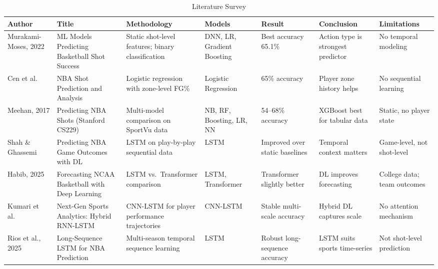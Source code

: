 \documentclass[conference]{IEEEtran}
\begin{document}
\begin{table}[!t]
\centering
\caption{Literature Survey}
\label{tab:litreview}
\renewcommand{\arraystretch}{1.3}
\setlength{\tabcolsep}{2pt}
\scriptsize
\begin{tabular}{|p{1.6cm}|p{3.5cm}|p{3.2cm}|p{1.8cm}|p{2.6cm}|p{2.4cm}|p{2.4cm}|}
\hline
\textbf{Author} & \textbf{Title} & \textbf{Methodology} &
\textbf{Models} & \textbf{Result} & \textbf{Conclusion} &
\textbf{Limitations} \\ \hline

Murakami-Moses, 2022 \cite{b1} &
ML Models Predicting Basketball Shot Success &
Static shot-level features; binary classification &
DNN, LR, Gradient Boosting &
Best accuracy 65.1\% &
Action type is strongest predictor &
No temporal modeling \\ \hline

Cen et al.\ \cite{b2} &
NBA Shot Prediction and Analysis &
Logistic regression with zone-level FG\% &
Logistic Regression &
65\% accuracy &
Player zone history helps &
No sequential learning \\ \hline

Meehan, 2017 \cite{b3} &
Predicting NBA Shots (Stanford CS229) &
Multi-model comparison on SportVu data &
NB, RF, Boosting, LR, NN &
54--68\% accuracy &
XGBoost best for tabular data &
Static, no player state \\ \hline

Shah \& Ghassemi \cite{b5} &
Predicting NBA Game Outcomes with DL &
LSTM on play-by-play sequential data &
LSTM &
Improved over static baselines &
Temporal context matters &
Game-level, not shot-level \\ \hline

Habib, 2025 \cite{b6} &
Forecasting NCAA Basketball with Deep Learning &
LSTM vs.\ Transformer comparison &
LSTM, Transformer &
Transformer slightly better &
DL improves forecasting &
College data; team outcomes \\ \hline

Kumari et al.\ \cite{b7} &
Next-Gen Sports Analytics: Hybrid RNN-LSTM &
CNN-LSTM for player performance trajectories &
CNN-LSTM &
Stable multi-scale accuracy &
Hybrid DL captures scale &
No attention mechanism \\ \hline

Rios et al., 2025 \cite{b8} &
Long-Sequence LSTM for NBA Prediction &
Multi-season temporal sequence learning &
LSTM &
Robust long-sequence accuracy &
LSTM suits sports time-series &
Not shot-level prediction \\ \hline


\end{tabular}
\end{table}
\end{document}
